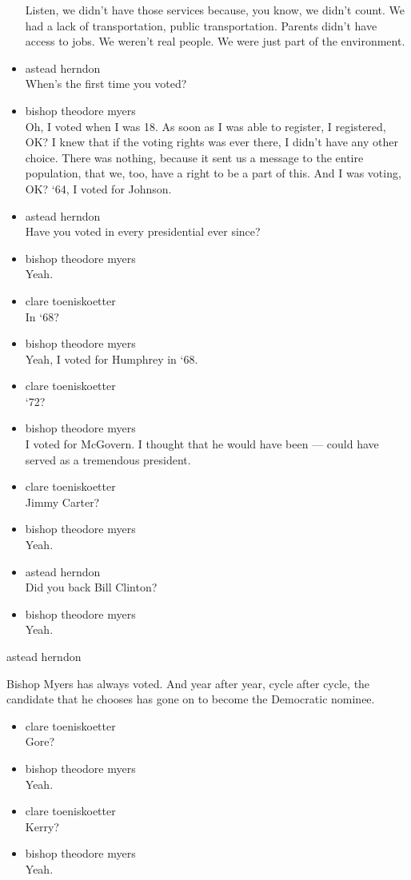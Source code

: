 \begin{itemize}
  Listen, we didn't have those services because, you know, we didn't
  count. We had a lack of transportation, public transportation. Parents
  didn't have access to jobs. We weren't real people. We were just part
  of the environment.
\item
  astead herndon\\
  When's the first time you voted?
\item
  bishop theodore myers\\
  Oh, I voted when I was 18. As soon as I was able to register, I
  registered, OK? I knew that if the voting rights was ever there, I
  didn't have any other choice. There was nothing, because it sent us a
  message to the entire population, that we, too, have a right to be a
  part of this. And I was voting, OK? `64, I voted for Johnson.
\item
  astead herndon\\
  Have you voted in every presidential ever since?
\item
  bishop theodore myers\\
  Yeah.
\item
  clare toeniskoetter\\
  In `68?
\item
  bishop theodore myers\\
  Yeah, I voted for Humphrey in `68.
\item
  clare toeniskoetter\\
  `72?
\item
  bishop theodore myers\\
  I voted for McGovern. I thought that he would have been --- could have
  served as a tremendous president.
\item
  clare toeniskoetter\\
  Jimmy Carter?
\item
  bishop theodore myers\\
  Yeah.
\item
  astead herndon\\
  Did you back Bill Clinton?
\item
  bishop theodore myers\\
  Yeah.
\end{itemize}

astead herndon

Bishop Myers has always voted. And year after year, cycle after cycle,
the candidate that he chooses has gone on to become the Democratic
nominee.

\begin{itemize}
\item
  clare toeniskoetter\\
  Gore?
\item
  bishop theodore myers\\
  Yeah.
\item
  clare toeniskoetter\\
  Kerry?
\item
  bishop theodore myers\\
  Yeah.
\end{itemize}

